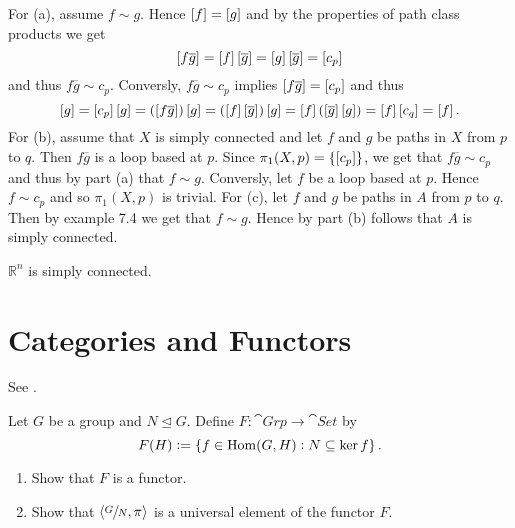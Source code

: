 \begin{solution}
For (a), assume $f \sim g$. Hence $\eqclass{f} = \eqclass{g}$ and by the properties of path class products \cite[189]{lee:topological_manifolds:2011} we get
\begin{equation*}
\eqclass{f\overline{g}} = \eqclass{f}\eqclass{\overline{g}} = \eqclass{g} \eqclass{\overline{g}} = \eqclass{c_p}
\end{equation*} 
\noindent and thus $f\overline{g} \sim c_p$. Conversly, $f\overline{g} \sim c_p$ implies $\eqclass{f\overline{g}} = \eqclass{c_p}$ and thus
\begin{equation*}
\eqclass{g} = \eqclass{c_p}\eqclass{g} = (\eqclass{f\overline{g}}) \eqclass{g} = (\eqclass{f}\eqclass{\overline{g}})\eqclass{g} =\eqclass{f} (\eqclass{\overline{g}}\eqclass{g}) = \eqclass{f}\eqclass{c_q} = \eqclass{f}.
\end{equation*}
For (b), assume that $X$ is simply connected and let $f$ and $g$ be paths in $X$ from $p$ to $q$. Then $f\overline{g}$ is a loop based at $p$. Since $\pi_1(X,p) = \cbr[0]{\eqclass{c_p}}$, we get that $f\overline{g} \sim c_p$ and thus by part (a) that $f \sim g$. Conversly, let $f$ be a loop based at $p$. Hence $f \sim c_p$ and so $\pi_1(X,p)$ is trivial.
For (c), let $f$ and $g$ be paths in $A$ from $p$ to $q$. Then by example 7.4 \cite[185--186]{lee:topological_manifolds:2011} we get that $f \sim g$. Hence by part (b) follows that $A$ is simply connected.
\end{solution}

\begin{corollary}
$\mathbb{R}^n$ is simply connected.
\end{corollary}

\section{Categories and Functors}
See \cite[57--58]{lane:cat:1971}.
\begin{exercise}
Let $G$ be a group and $N \unlhd G$. Define $F: \cat{Grp} \to \cat{Set}$ by 
\begin{equation}
F(H) := \cbr[0]{f \in \Hom(G,H) : N \subseteq \ker f}.
\end{equation}
\begin{enumerate}
\item Show that $F$ is a functor.
\item Show that $\langle \sfrac{G}{N},\pi \rangle$ is a universal element of the functor $F$.
\end{enumerate}
\end{exercise}


